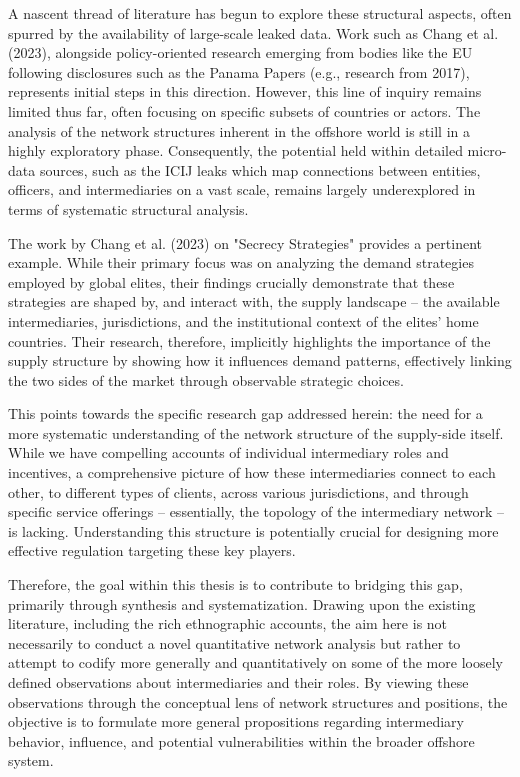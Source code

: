 A nascent thread of literature has begun to explore these structural aspects, often spurred by the availability of large-scale leaked data. Work such as Chang et al. (2023), alongside policy-oriented research emerging from bodies like the EU following disclosures such as the Panama Papers (e.g., research from 2017), represents initial steps in this direction. However, this line of inquiry remains limited thus far, often focusing on specific subsets of countries or actors. The analysis of the network structures inherent in the offshore world is still in a highly exploratory phase. Consequently, the potential held within detailed micro-data sources, such as the ICIJ leaks which map connections between entities, officers, and intermediaries on a vast scale, remains largely underexplored in terms of systematic structural analysis.

The work by Chang et al. (2023) on "Secrecy Strategies" provides a pertinent example. While their primary focus was on analyzing the demand strategies employed by global elites, their findings crucially demonstrate that these strategies are shaped by, and interact with, the supply landscape – the available intermediaries, jurisdictions, and the institutional context of the elites' home countries. Their research, therefore, implicitly highlights the importance of the supply structure by showing how it influences demand patterns, effectively linking the two sides of the market through observable strategic choices.

This points towards the specific research gap addressed herein: the need for a more systematic understanding of the network structure of the supply-side itself. While we have compelling accounts of individual intermediary roles and incentives, a comprehensive picture of how these intermediaries connect to each other, to different types of clients, across various jurisdictions, and through specific service offerings – essentially, the topology of the intermediary network – is lacking. Understanding this structure is potentially crucial for designing more effective regulation targeting these key players.

Therefore, the goal within this thesis is to contribute to bridging this gap, primarily through synthesis and systematization. Drawing upon the existing literature, including the rich ethnographic accounts, the aim here is not necessarily to conduct a novel quantitative network analysis but rather to attempt to codify more generally and quantitatively on some of the more loosely defined observations about intermediaries and their roles. By viewing these observations through the conceptual lens of network structures and positions, the objective is to formulate more general propositions regarding intermediary behavior, influence, and potential vulnerabilities within the broader offshore system. 

